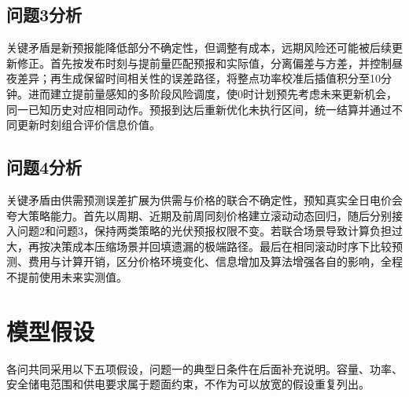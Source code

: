 \documentclass[withoutpreface,bwprint]{cumcmthesis}
\begin{document}
\subsection*{问题3分析}
关键矛盾是新预报能降低部分不确定性，但调整有成本，远期风险还可能被后续更新修正。首先按发布时刻与提前量匹配预报和实际值，分离偏差与方差，并控制昼夜差异；再生成保留时间相关性的误差路径，将整点功率校准后插值积分至10分钟。进而建立提前量感知的多阶段风险调度，使0时计划预先考虑未来更新机会，同一已知历史对应相同动作。预报到达后重新优化未执行区间，统一结算并通过不同更新时刻组合评价信息价值。

\subsection*{问题4分析}
关键矛盾由供需预测误差扩展为供需与价格的联合不确定性，预知真实全日电价会夸大策略能力。首先以周期、近期及前周同刻价格建立滚动动态回归，随后分别接入问题2和问题3，保持两类策略的光伏预报权限不变。若联合场景导致计算负担过大，再按决策成本压缩场景并回填遗漏的极端路径。最后在相同滚动时序下比较预测、费用与计算开销，区分价格环境变化、信息增加及算法增强各自的影响，全程不提前使用未来实测值。

\clearpage
\section{模型假设}
各问共同采用以下五项假设，问题一的典型日条件在后面补充说明。容量、功率、安全储电范围和供电要求属于题面约束，不作为可以放宽的假设重复列出。
\end{document}
